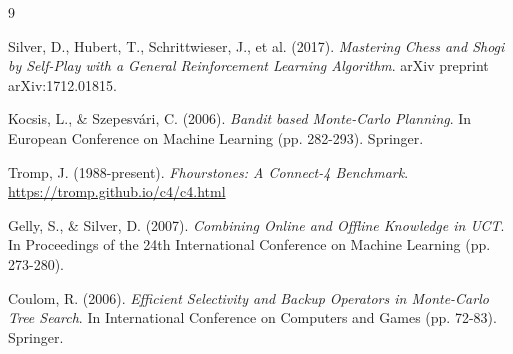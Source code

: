 \documentclass[11pt]{article}
\begin{document}
\begin{thebibliography}{9}

Silver, D., Hubert, T., Schrittwieser, J., et al. (2017).
\textit{Mastering Chess and Shogi by Self-Play with a General Reinforcement Learning Algorithm}.
arXiv preprint arXiv:1712.01815.

Kocsis, L., \& Szepesv\'{a}ri, C. (2006).
\textit{Bandit based Monte-Carlo Planning}.
In European Conference on Machine Learning (pp. 282-293). Springer.

Tromp, J. (1988-present).
\textit{Fhourstones: A Connect-4 Benchmark}.
\url{https://tromp.github.io/c4/c4.html}

Gelly, S., \& Silver, D. (2007).
\textit{Combining Online and Offline Knowledge in UCT}.
In Proceedings of the 24th International Conference on Machine Learning (pp. 273-280).

Coulom, R. (2006).
\textit{Efficient Selectivity and Backup Operators in Monte-Carlo Tree Search}.
In International Conference on Computers and Games (pp. 72-83). Springer.

\end{thebibliography}
\end{document}

